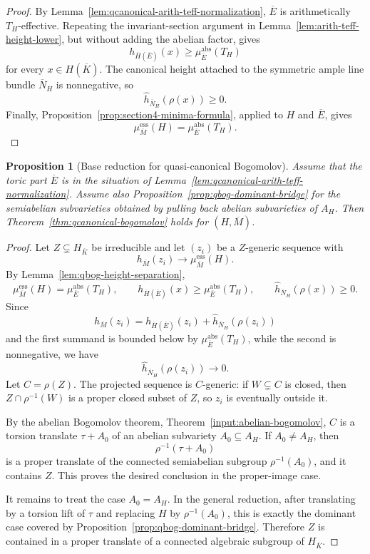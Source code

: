 \documentclass[10pt,a4paper]{amsart}
\theoremstyle{plain}
\newtheorem{proposition}[theorem]{Proposition}
\theoremstyle{plain}
\numberwithin{equation}{section}
\providecommand{\bN}{\overline{N}}
\providecommand{\bE}{\overline{E}}
\providecommand{\bM}{\overline{M}}
\providecommand{\muess}{\mu^{\mathrm{ess}}}
\providecommand{\muabs}{\mu^{\mathrm{abs}}}
\begin{document}
\begin{proof}
	By Lemma~\ref{lem:qcanonical-arith-teff-normalization}, \(\bE\) is
	arithmetically \(T_H\)-effective.  Repeating the invariant-section argument in
	Lemma~\ref{lem:arith-teff-height-lower}, but without adding the abelian factor,
	gives
	\[
	h_{\overline H(\bE)}(x)\ge\muabs_{\bE}(T_H)
	\]
	for every \(x\in H(\overline K)\).  The canonical height attached to the
	symmetric ample line bundle \(\bN_H\) is nonnegative, so
	\[
	\hat h_{\bN_H}(\rho(x))\ge0.
	\]
	Finally, Proposition~\ref{prop:section4-minima-formula}, applied to \(H\) and
	\(\bE\), gives
	\[
	\muess_{\bM}(H)=\muabs_{\bE}(T_H).
	\]
\end{proof}

\begin{proposition}[Base reduction for quasi-canonical Bogomolov]
	\label{prop:qbog-base-reduction}
	Assume that the toric part \(\bE\) is in the situation of
	Lemma~\ref{lem:qcanonical-arith-teff-normalization}.  Assume also
	Proposition~\ref{prop:qbog-dominant-bridge} for the semiabelian subvarieties
	obtained by pulling back abelian subvarieties of \(A_H\).  Then
	Theorem~\ref{thm:qcanonical-bogomolov} holds for \((H,\bM)\).
\end{proposition}

\begin{proof}
	Let \(Z\subsetneq H_{\overline K}\) be irreducible and let \((z_i)\) be a
	\(Z\)-generic sequence with
	\[
	h_{\bM}(z_i)\to\muess_{\bM}(H).
	\]
	By
	Lemma~\ref{lem:qbog-height-separation},
	\[
	\muess_{\bM}(H)=\muabs_{\bE}(T_H),\qquad
	h_{\overline H(\bE)}(x)\ge\muabs_{\bE}(T_H),\qquad
	\hat h_{\bN_H}(\rho(x))\ge0 .
	\]
	Since
	\[
	h_{\bM}(z_i)
	=h_{\overline H(\bE)}(z_i)+\hat h_{\bN_H}(\rho(z_i))
	\]
	and the first summand is bounded below by \(\muabs_{\bE}(T_H)\), while the
	second is nonnegative, we have
	\[
	\hat h_{\bN_H}(\rho(z_i))\to0.
	\]
	Let \(C=\rho(Z)\).  The projected sequence is \(C\)-generic: if
	\(W\subsetneq C\) is closed, then \(Z\cap\rho^{-1}(W)\) is a proper closed
	subset of \(Z\), so \(z_i\) is eventually outside it.
	
	By the abelian Bogomolov theorem, Theorem~\ref{input:abelian-bogomolov}, \(C\) is
	a torsion translate \(\tau+A_0\) of an abelian subvariety \(A_0\subseteq A_H\).
	If \(A_0\neq A_H\), then
	\[
	\rho^{-1}(\tau+A_0)
	\]
	is a proper translate of the connected semiabelian subgroup
	\(\rho^{-1}(A_0)\), and it contains \(Z\).  This proves the desired conclusion
	in the proper-image case.
	
	It remains to treat the case \(A_0=A_H\).  In the general reduction, after
	translating by a torsion lift of \(\tau\) and replacing \(H\) by
	\(\rho^{-1}(A_0)\), this is exactly the dominant case covered by
	Proposition~\ref{prop:qbog-dominant-bridge}.  Therefore \(Z\) is contained in a
	proper translate of a connected algebraic subgroup of \(H_{\overline K}\).
\end{proof}
\end{document}
